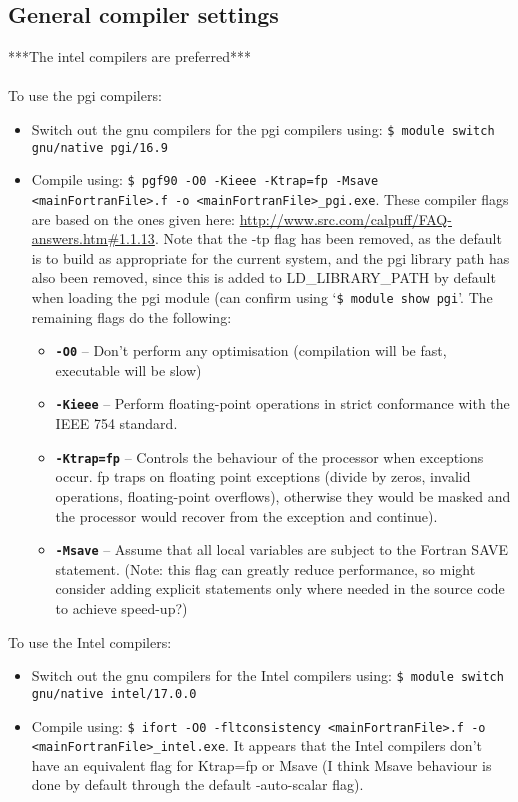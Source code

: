 \documentclass[10pt,a4paper]{article}
\begin{document}
\subsection{General compiler settings}
***The intel compilers are preferred***\\\\
To use the pgi compilers:
\begin{itemize}
\item Switch out the gnu compilers for the pgi compilers using: \texttt{\$ module switch gnu/native pgi/16.9}
\item Compile using: \texttt{\$ pgf90 -O0 -Kieee -Ktrap=fp -Msave <mainFortranFile>.f -o <mainFortranFile>\_pgi.exe}. These compiler flags are based on the ones given here: \url{http://www.src.com/calpuff/FAQ-answers.htm#1.1.13}. Note that the -tp flag has been removed, as the default is to build as appropriate for the current system, and the pgi library path has also been removed, since this is added to LD\_LIBRARY\_PATH by default when loading the pgi module (can confirm using `\texttt{\$ module show pgi}'. The remaining flags do the following:
\begin{itemize}
\item \texttt{\textbf{-O0}} -- Don't perform any optimisation (compilation will be fast, executable will be slow)
\item \texttt{\textbf{-Kieee}} -- Perform floating-point operations in strict conformance with the IEEE 754 standard.
\item \texttt{\textbf{-Ktrap=fp}} -- Controls the behaviour of the processor when exceptions occur. fp traps on floating point exceptions (divide by zeros, invalid operations, floating-point overflows), otherwise they would be masked and the processor would recover from the exception and continue).
\item \texttt{\textbf{-Msave}} -- Assume that all local variables are subject to the Fortran SAVE statement. (Note: this flag can greatly reduce performance, so might consider adding explicit statements only where needed in the source code to achieve speed-up?)
\end{itemize}
\end{itemize}
To use the Intel compilers:
\begin{itemize}
\item Switch out the gnu compilers for the Intel compilers using: \texttt{\$ module switch gnu/native intel/17.0.0}
\item Compile using: \texttt{\$ ifort -O0 -fltconsistency <mainFortranFile>.f -o <mainFortranFile>\_intel.exe}. It appears that the Intel compilers don't have an equivalent flag for Ktrap=fp or Msave (I think Msave behaviour is done by default through the default -auto-scalar flag).
\end{itemize}
\end{document}
